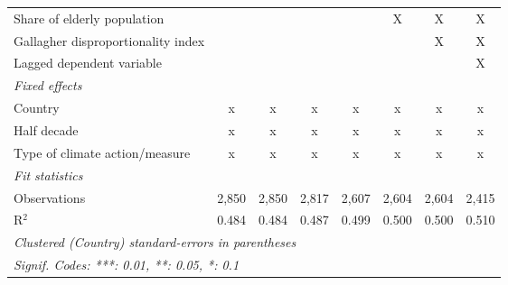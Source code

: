 \begin{tabular}{lccccccc}
   Share of elderly population                                     &                &                &                &               & X             & X             & X\\  
   Gallagher disproportionality index                              &                &                &                &               &               & X             & X\\  
   Lagged dependent variable                                       &                &                &                &               &               &               & X\\  
   \emph{Fixed effects}\\
   Country                                                         & x              & x              & x              & x             & x             & x             & x\\  
   Half decade                                                     & x              & x              & x              & x             & x             & x             & x\\  
   Type of climate action/measure                                  & x              & x              & x              & x             & x             & x             & x\\  
   \midrule \emph{Fit statistics}\\
   Observations                                                    & 2,850          & 2,850          & 2,817          & 2,607         & 2,604         & 2,604         & 2,415\\  
   R$^2$                                                           & 0.484          & 0.484          & 0.487          & 0.499         & 0.500         & 0.500         & 0.510\\  
   \midrule
   \multicolumn{8}{l}{\emph{Clustered (Country) standard-errors in parentheses}}\\
   \multicolumn{8}{l}{\emph{Signif. Codes: ***: 0.01, **: 0.05, *: 0.1}}\\
\end{tabular}
\par\endgroup


